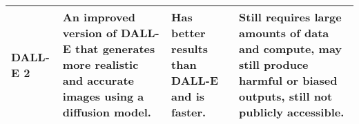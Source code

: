 \begin{table}[ht]
\begin{tabularx}{\textwidth}{|X|X|X|X|}
DALL-E 2~\cite{ramesh_hierarchical_2022}                & An improved version of DALL-E that generates more realistic and accurate images using a diffusion model.                              & Has better results than DALL-E and is faster.                                                                                                      & Still requires large amounts of data and compute, may still produce harmful or biased outputs, still not publicly accessible. \\ \hline
\end{tabularx}
\label{tab:data-generators}
\end{table}






